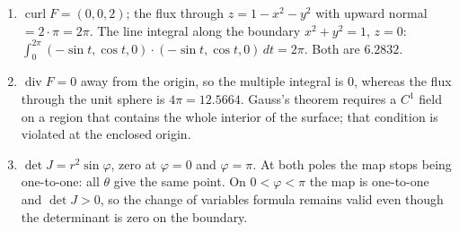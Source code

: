 \begin{enumerate}[label=\textbf{15.\arabic*}]
  \item $\operatorname{curl}F=(0,0,2)$; the flux through $z=1-x^{2}-y^{2}$ with
        upward normal $=2\cdot\pi=2\pi$. The line integral along the boundary
        $x^{2}+y^{2}=1$, $z=0$:
        $\int_{0}^{2\pi}(-\sin t,\cos t,0)\cdot(-\sin t,\cos t,0)\,dt=2\pi$.
        Both are $6.2832$.

  \item $\operatorname{div}F=0$ away from the origin, so the multiple integral is $0$,
        whereas the flux through the unit sphere is $4\pi=12.5664$. Gauss's theorem
        requires a $C^{1}$ field on a region that contains the whole interior of the
        surface; that condition is violated at the enclosed origin.

  \item $\det J=r^{2}\sin\varphi$, zero at $\varphi=0$ and $\varphi=\pi$. At both
        poles the map stops being one-to-one: all $\theta$ give the same point.
        On $0<\varphi<\pi$ the map is one-to-one and $\det J>0$, so the change of
        variables formula remains valid even though the determinant is zero on the boundary.
\end{enumerate}
